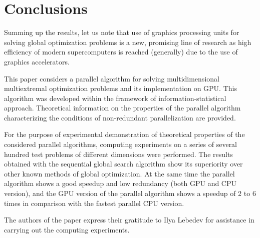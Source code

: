 \documentclass[smallcondensed]{svjour3}     %
\begin{document}
\section{Conclusions} \label{sec:7}

Summing up the results, let us note that use of graphics processing units for solving global optimization problems is a new, promising line of research as high efficiency of modern supercomputers is reached (generally) due to the use of graphics accelerators. 

This paper considers a parallel algorithm for solving multidimensional multiextremal optimization problems and its implementation on GPU. This algorithm was developed within the framework of information-statistical approach. Theoretical information on the properties of the parallel algorithm characterizing the conditions of non-redundant parallelization are provided.

For the purpose of experimental demonstration of theoretical properties of the considered parallel algorithms, computing experiments on a series of several hundred test problems of different dimensions were performed. The results obtained with the sequential global search algorithm show its superiority over other known methods of global optimization. At the same time the parallel algorithm shows a good speedup and low redundancy (both GPU and CPU version), and the GPU version of the parallel algorithm shows a speedup of 2 to 6 times in comparison with the fastest parallel CPU version.

\begin{acknowledgements}

The authors of the paper express their gratitude to Ilya Lebedev for assistance in carrying out the computing experiments.

\end{acknowledgements}

\end{document}

